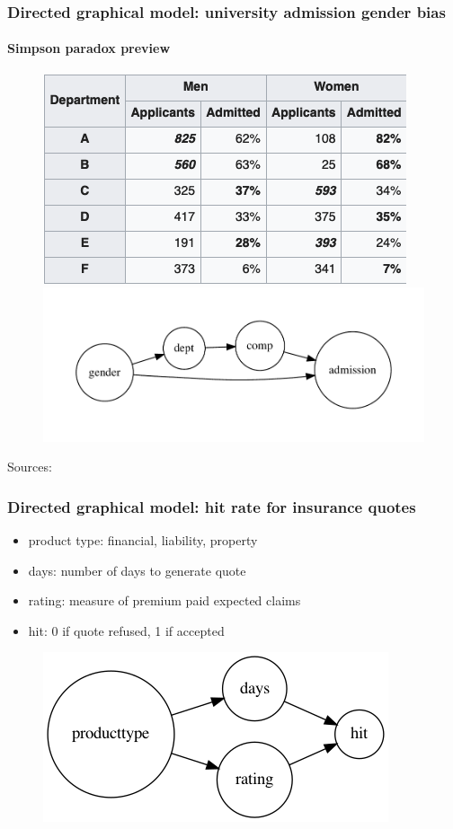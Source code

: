 \begin{frame}
  \frametitle{Directed graphical model: university admission gender bias}
  \framesubtitle{Simpson paradox preview}

  \begin{figure}[ht]
    \centering
            \includegraphics[height=0.35\textheight]{graphics/berkeley_later} 
            \includegraphics[height=0.35\textheight]{graphics/admission_later}
    \end{figure}
    Sources: \cite{simpson-wikipedia} \cite{Bickel398}
\end{frame}


\begin{frame}
\frametitle{Directed graphical model: hit rate for insurance quotes}
\begin{itemize}
  \item product type: financial, liability, property
  \item days: number of days to generate quote
  \item rating: measure of premium paid expected claims
  \item hit: 0 if quote refused, 1 if accepted
\end{itemize}
\begin{figure}[ht]
  \centering
  \includegraphics[height=0.7\textheight]{graphics/hits}
\end{figure}
\end{frame}


